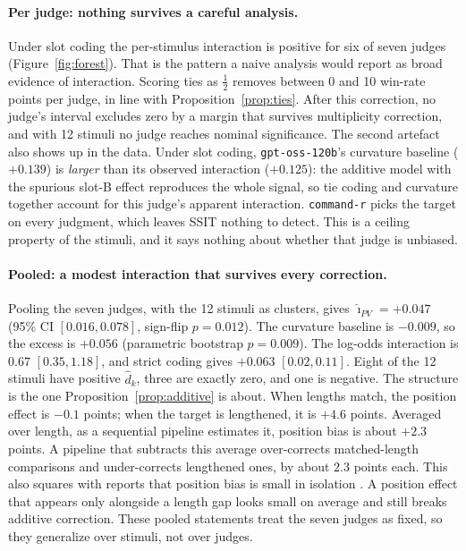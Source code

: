 \documentclass[10pt]{article}
\theoremstyle{remark}
\newcommand{\hiPV}{\hat\imath_{PV}}
\begin{document}
\paragraph{Per judge: nothing survives a careful analysis.}
Under slot coding the per-stimulus interaction is positive for six of
seven judges (Figure~\ref{fig:forest}). That is the pattern a naive
analysis would report as broad evidence of interaction. Scoring ties as
$\tfrac12$ removes between 0 and 10 win-rate points per judge, in line
with Proposition~\ref{prop:ties}. After this correction, no judge's
interval excludes zero by a margin that survives multiplicity
correction, and with 12 stimuli no judge reaches nominal significance.
The second artefact also shows up in the data. Under slot coding,
\texttt{gpt-oss-120b}'s curvature baseline ($+0.139$) is
\emph{larger} than its observed interaction ($+0.125$): the additive
model with the spurious slot-B effect reproduces the whole signal, so
tie coding and curvature together account for this judge's apparent
interaction. \texttt{command-r} picks the target on every
judgment, which leaves SSIT nothing to detect. This is a ceiling
property of the stimuli, and it says nothing about whether that judge
is unbiased.

\paragraph{Pooled: a modest interaction that survives every correction.}
Pooling the seven judges, with the 12 stimuli as clusters, gives
$\hiPV=+0.047$ (95\% CI $[0.016, 0.078]$, sign-flip $p=0.012$). The
curvature baseline is $-0.009$, so the excess is $+0.056$ (parametric
bootstrap $p=0.009$). The log-odds interaction is $0.67$
$[0.35, 1.18]$, and strict coding gives $+0.063$ $[0.02, 0.11]$. Eight
of the 12 stimuli have positive $\hat d_k$, three are exactly zero, and
one is negative. The structure is the one
Proposition~\ref{prop:additive} is about. When lengths match, the position effect is $-0.1$ points;
when the target is lengthened, it is $+4.6$ points. Averaged over
length, as a sequential pipeline estimates it, position bias is about
$+2.3$ points. A pipeline that subtracts this average over-corrects
matched-length comparisons and under-corrects lengthened ones, by about
$2.3$ points each. This also squares with reports that position bias is
small in isolation \citep{soumik2026mitigation}. A position effect that
appears only alongside a length gap looks small on average and still
breaks additive correction. These pooled statements treat the seven
judges as fixed, so they generalize over stimuli, not over judges.
\end{document}
